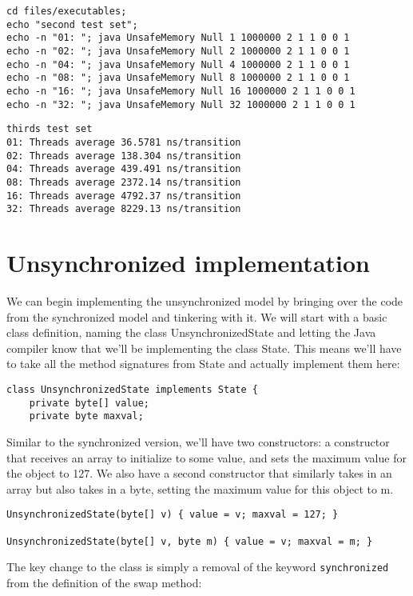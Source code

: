 \documentclass[11pt]{article}
\begin{document}
\begin{verbatim}
cd files/executables;
echo "second test set";
echo -n "01: "; java UnsafeMemory Null 1 1000000 2 1 1 0 0 1
echo -n "02: "; java UnsafeMemory Null 2 1000000 2 1 1 0 0 1
echo -n "04: "; java UnsafeMemory Null 4 1000000 2 1 1 0 0 1
echo -n "08: "; java UnsafeMemory Null 8 1000000 2 1 1 0 0 1
echo -n "16: "; java UnsafeMemory Null 16 1000000 2 1 1 0 0 1
echo -n "32: "; java UnsafeMemory Null 32 1000000 2 1 1 0 0 1
\end{verbatim}


\begin{verbatim}
thirds test set
01: Threads average 36.5781 ns/transition
02: Threads average 138.304 ns/transition
04: Threads average 439.491 ns/transition
08: Threads average 2372.14 ns/transition
16: Threads average 4792.37 ns/transition
32: Threads average 8229.13 ns/transition
\end{verbatim}

\section{Unsynchronized implementation}
\label{sec-3}
We can begin implementing the unsynchronized model by bringing over
the code from the synchronized model and tinkering with it. We will
start with a basic class definition, naming the class
UnsynchronizedState and letting the Java compiler know that we'll be
implementing the class State. This means we'll have to take all the
method signatures from State and actually implement them here:

\begin{verbatim}
class UnsynchronizedState implements State {
    private byte[] value;
    private byte maxval;
\end{verbatim}

Similar to the synchronized version, we'll have two constructors: a
constructor that receives an array to initialize to some value, and
sets the maximum value for the object to 127. We also have a second
constructor that similarly takes in an array but also takes in a
byte, setting the maximum value for this object to m.

\begin{verbatim}
UnsynchronizedState(byte[] v) { value = v; maxval = 127; }

UnsynchronizedState(byte[] v, byte m) { value = v; maxval = m; }
\end{verbatim}

The key change to the class is simply a removal of the keyword
\verb~synchronized~ from the definition of the swap method:
\end{document}
